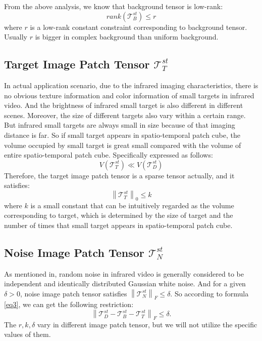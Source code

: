 \documentclass[journal]{IEEEtran}
\begin{document}
From the above analysis, we know that background tensor is low-rank:
\begin{equation}
  rank(\bm{\mathcal T}_B^{st}) \leq r
\end{equation}
where $r$ is a low-rank constant constraint corresponding to background tensor. Usually $r$ is bigger in complex background than uniform background.


\subsection{Target Image Patch Tensor $\mathbf{\mathcal T}_T^{st}$}
In actual application scenario, due to the infrared imaging characteristics, there is no obvious texture information and color information of small targets in infrared video. And the brightness of infrared small target is also different in different scenes. Moreover, the size of different targets also vary within a certain range. But infrared small targets are always small in size because of that imaging distance is far. So if small target appears in spatio-temporal patch cube, the volume occupied by small target is great small compared with the volume of entire spatio-temporal patch cube. Specifically expressed as follows:
\begin{equation}
  V(\bm{\mathcal T}_T^{st}) \ll V(\bm{\mathcal T}_D^{st})
\end{equation}
Therefore, the target image patch tensor is a sparse tensor actually, and it satisfies:
\begin{equation}
  \left \| \bm{\mathcal T}_T^{st} \right \|_0 \leq k
\end{equation}
where $k$ is a small constant that can be intuitively regarded as the volume corresponding to target, which is determined by the size of target and the number of times that small target appears in spatio-temporal patch cube.

\subsection{Noise Image Patch Tensor $\mathbf{\mathcal T}_N^{st}$}
As mentioned in\cite{gao2013infrared}, random noise in infrared video is generally considered to be independent and identically distributed Gaussian white noise. And for a given $\delta>0$, noise image patch tensor satisfies $\left \| \bm{\mathcal T}_N^{st} \right \|_F \leq \delta$. So according to formula \ref{eq3}, we can get the following restriction:
\begin{equation}
  \left \| \bm{\mathcal T}_D^{st}-\bm{\mathcal T}_B^{st}-\bm{\mathcal T}_T^{st} \right \|_F \leq \delta.
\end{equation}
The $r,k,\delta$ vary in different image patch tensor, but we will not utilize the specific values of them.
\end{document}
